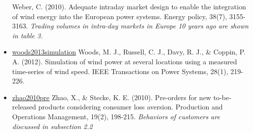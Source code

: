 \documentclass[letterpaper,8pt,twocolumn,twoside,]{pinp}
\begin{document}
\begin{itemize}
  Weber, C. (2010). Adequate intraday market design to enable the
  integration of wind energy into the European power systems. Energy
  policy, 38(7), 3155-3163. \emph{Trading volumes in intra-day markets
  in Europe 10 years ago are shown in table 3.}
\item
  \href{https://ieeexplore.ieee.org/document/6262462}{woods2013simulation}
  Woods, M. J., Russell, C. J., Davy, R. J., \& Coppin, P. A. (2012).
  Simulation of wind power at several locations using a measured
  time-series of wind speed. IEEE Transactions on Power Systems, 28(1),
  219-226.
\item
  \href{https://onlinelibrary.wiley.com/doi/abs/10.1111/j.1937-5956.2009.01092.x?casa_token=OFXPwPdWLU0AAAAA:5l-61h0Fl19UbgKSXoJEyS85zUGGyqK8-G6A4TImpG4StMJtsJKjokbC6r4jwvezceSVpybsbpqsZ8A}{zhao2010pre}
  Zhao, X., \& Stecke, K. E. (2010). Pre‐orders for new to‐be‐released
  products considering consumer loss aversion. Production and Operations
  Management, 19(2), 198-215. \emph{Behaviors of customers are discussed
  in subsection 2.2}
\end{itemize}

\end{document}

